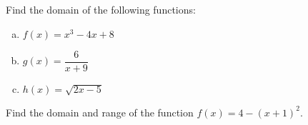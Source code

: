 \documentclass[11pt,letterpaper]{article}
\begin{document}

\problem Find the domain of the following functions:
	\begin{enumerate}[(a)]
	\item $f(x)= x^3 - 4x + 8$
	\item $g(x)= \dfrac{6}{x + 9}$
	\item $h(x)= \sqrt{2x - 5}$
	\end{enumerate} \vfill


\problem Find the domain and range of the function $f(x)= 4 - (x + 1)^2$. \vfill
\end{document}
